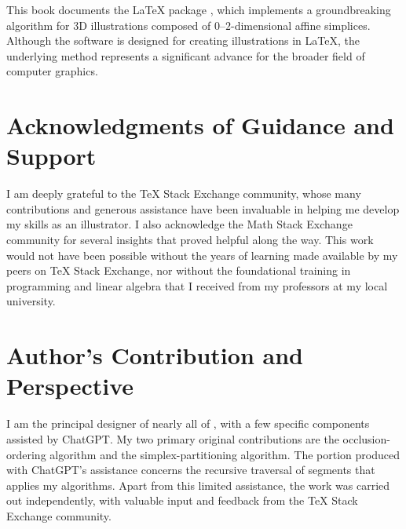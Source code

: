 This book documents the \LaTeX{} package \luatikztdtools{}, which
implements a groundbreaking algorithm for \(3\)D illustrations
composed of \(0\)--\(2\)-dimensional affine simplices. Although the
software is designed for creating illustrations in \LaTeX{}, the
underlying method represents a significant advance for the broader
field of computer graphics.

\section*{Acknowledgments of Guidance and Support}

I am deeply grateful to the \TeX{} Stack Exchange community, whose
many contributions and generous assistance have been invaluable in
helping me develop my skills as an illustrator. I also acknowledge
the Math Stack Exchange community for several insights that proved
helpful along the way. This work would not have been possible without
the years of learning made available by my peers on \TeX{} Stack
Exchange, nor without the foundational training in programming and
linear algebra that I received from my professors at my local
university.

\section*{Author's Contribution and Perspective}

I am the principal designer of nearly all of \luatikztdtools{},
with a few specific components assisted by ChatGPT. My two
primary original contributions are the occlusion-ordering
algorithm and the simplex-partitioning algorithm. The portion
produced with ChatGPT's assistance concerns the recursive
traversal of segments that applies my algorithms. Apart from
this limited assistance, the work was carried out independently,
with valuable input and feedback from the \TeX{} Stack Exchange
community.

